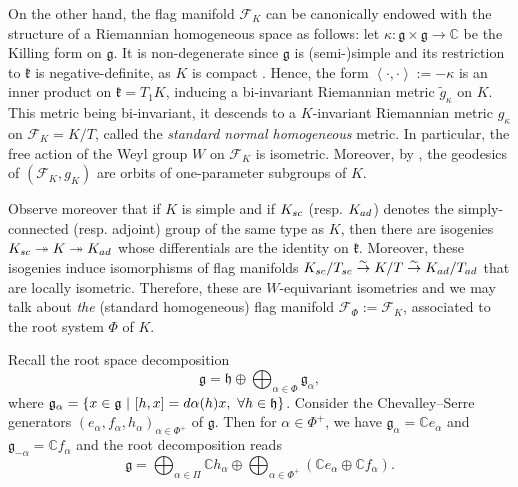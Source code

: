 \documentclass[11pt,twoside]{amsart}
\theoremstyle{plain}
\newcommand{\C}{{\mathbb C}}
\begin{document}
On the other hand, the flag manifold $\mathcal{F}_K$ can be canonically endowed with the structure of a Riemannian homogeneous space as follows: let $\kappa : \mathfrak{g}\times\mathfrak{g}\to\C$ be the Killing form on $\mathfrak{g}$. It is non-degenerate since $\mathfrak{g}$ is (semi-)simple and its restriction to $\mathfrak{k}$ is negative-definite, as $K$ is compact \cite[Lemma 7.36]{besse_einstein}. Hence, the form $\left<\cdot,\cdot\right>:=-\kappa$ is an inner product on $\mathfrak{k}=T_1K$, inducing a bi-invariant Riemannian metric $\widetilde{g}_\kappa$ on $K$. This metric being bi-invariant, it descends to a $K$-invariant Riemannian metric $g_\kappa$ on $\mathcal{F}_K=K/T$, called the \textit{standard normal homogeneous} metric. In particular, the free action of the Weyl group $W$ on $\mathcal{F}_K$ is isometric. Moreover, by \cite[Theorem 2.5]{ye-wong-lim}, the geodesics of $(\mathcal{F}_K,g_K)$ are orbits of one-parameter subgroups of $K$.

Observe moreover that if $K$ is simple and if $K_{\rm sc}$ (resp. $K_{\rm ad}$) denotes the simply-connected (resp. adjoint) group of the same type as $K$, then there are isogenies $K_{\rm sc}\twoheadrightarrow K\twoheadrightarrow K_{\rm ad}$ whose differentials are the identity on $\mathfrak{k}$. Moreover, these isogenies induce isomorphisms of flag manifolds $K_{\rm sc}/T_{\rm sc}\stackrel{\tiny{\sim}}\to K/T\stackrel{\tiny{\sim}}\to K_{\rm ad}/T_{\rm ad}$ that are locally isometric. Therefore, these are $W$-equivariant isometries and we may talk about \textit{the} (standard homogeneous) flag manifold $\mathcal{F}_\Phi:=\mathcal{F}_K$, associated to the root system $\Phi$ of $K$.

Recall the root space decomposition 
\[\mathfrak{g}=\mathfrak{h}\oplus\bigoplus_{\alpha\in\Phi}\mathfrak{g}_\alpha,\]
where $\mathfrak{g}_\alpha=\{x\in\mathfrak{g}~|~[h,x]={\rm d}\alpha(h)x,~\forall h\in\mathfrak{h}\}$. Consider the Chevalley--Serre generators $(e_\alpha,f_\alpha,h_\alpha)_{\alpha\in\Phi^+}$ of $\mathfrak{g}$. Then for $\alpha\in\Phi^+$, we have $\mathfrak{g}_{\alpha}=\C e_\alpha$ and $\mathfrak{g}_{-\alpha}=\C f_\alpha$ and the root decomposition reads
\[\mathfrak{g}=\bigoplus_{\alpha\in\Pi}\C h_\alpha\oplus\bigoplus_{\alpha\in\Phi^+}(\C e_\alpha\oplus\C f_\alpha).\]
\end{document}
